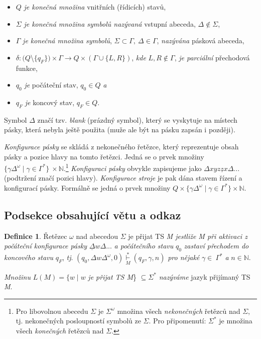 \documentclass[11pt, a4paper, twocolumn]{article}
\theoremstyle{definition}
\newtheorem{definition}{Definice}
\begin{document}
\begin{itemize}
	\item $Q$ \emph{je konečná množina} vnitřních (řídicích) stavů,
	\item $\Sigma$ \emph{je konečná množina symbolů nazývaná} vstupní
abeceda, $\Delta \notin \Sigma$,
	\item $\Gamma$ \emph{je konečná množina symbolů}, $\Sigma \subset \Gamma,\  \Delta \in \Gamma$, \emph{nazývána} pásková abeceda,
	\item{ $\delta: (Q$\textbackslash $\{q_F\})\times \Gamma\rightarrow Q\times(\Gamma\cup\{L,R\})$, \emph{kde} $L, R\notin \Gamma$, \emph{je parciální} přechodová funkce,}
	\item $q_0$ \emph{je} počáteční stav, $q_0\in Q$ \emph{a}
	\item $q_F$ \emph{je} koncový stav, $q_F \in Q$.	
\end{itemize}

Symbol $\Delta$ značí tzv. \emph{blank} (prázdný symbol), který se vyskytuje na místech pásky, která nebyla ještě použita
(muže ale být na pásku zapsán i později). \par

\emph{Konfigurace pásky} se skládá z nekonečného řetězce, který reprezentuje obsah pásky a pozice hlavy na tomto řetězci. Jedná se o prvek množiny $\{\gamma\Delta^\omega \mid \gamma \in \Gamma^\ast\}\  \times \mathbb{N}$.\footnote{Pro libovolnou abecedu $\Sigma$ je $\Sigma^\omega$ množina všech \emph{nekonečných} řetězců nad $\Sigma$, tj. nekonečných posloupností symbolů ze $\Sigma$. Pro připomenutí: $\Sigma^\ast$ je množina všech \emph{konečných} řetězců nad $\Sigma$.} \emph{Konfiguraci pásky} obvykle zapisujeme jako $\Delta xyz\underline{z}x\Delta...$ (podtržení značí pozici hlavy).\emph{ Konfigurace stroje} je pak dána stavem řízení a konfigurací pásky. Formálně se jedná
o prvek množiny $Q \times \{\gamma\Delta^\omega \mid \gamma \in \Gamma^\ast\} \times \mathbb{N}$.

\subsection{Podsekce obsahující větu a odkaz}

\begin{definition}\label{def:rovnice2}
Řetězec $\omega$ nad abecedou $\Sigma$ je přijat TS \emph{M
jestliže M při aktivaci z počáteční konfigurace pásky} $\underline{\Delta}w\Delta...$ \emph{a počátečního stavu} $q_0$ \emph{zastaví přechodem do koncového stavu} $q_F$, \emph{tj}. $(q_0, \Delta w \Delta^\omega, 0) \underset{M}{\overset{\ast}{\vdash}}(q_F, \gamma, n)$\emph{ pro nějaké} $\gamma \in~ \Gamma^\ast$ \emph{a} $n \in \mathbb{N}$. \par
\emph{Množinu} $L(M) = \{w \mid w$ \emph{je přijat TS M}\} $\subseteq \Sigma^\ast$ \emph{nazýváme} jazyk přijímaný TS \emph{M}.
\end{definition}
\end{document}
